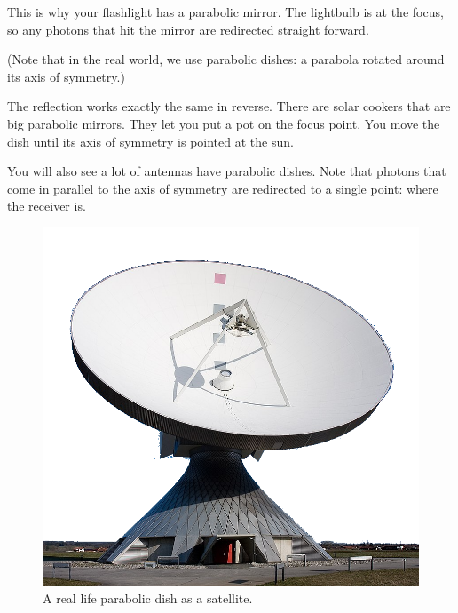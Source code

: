 This is why your flashlight has a parabolic mirror. The lightbulb is
at the focus, so any photons that hit the mirror are redirected
straight forward.

(Note that in the real world, we use parabolic dishes: a parabola rotated around its axis of
symmetry.)

The reflection works exactly the same in reverse. There are solar
cookers that are big parabolic mirrors. They let you put a pot on the
focus point. You move the dish until its axis of symmetry is pointed
at the sun.

You will also see a lot of antennas have parabolic dishes. Note that
photons that come in parallel to the axis of symmetry are redirected
to a single point: where the receiver is.
\begin{figure}[htbp]
    \centering
    \includegraphics[width=0.7\linewidth]{dish.png}
    \caption{A real life parabolic dish as a satellite.}
    \label{fig:dish}
\end{figure}



